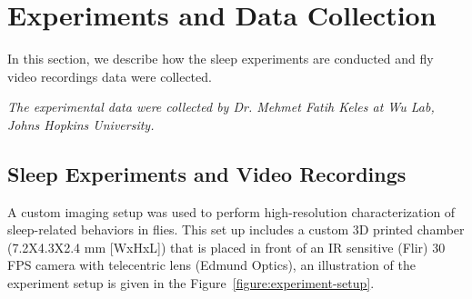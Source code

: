 \chapter{Experiments and Data Collection}\label{chapter:expt-data-collection}
In this section, we describe how the sleep experiments are conducted and fly video recordings data were collected.

\textit{The experimental data were collected by Dr. Mehmet Fatih Keles at Wu Lab, Johns Hopkins University.}

\section{Sleep Experiments and Video Recordings}
A custom imaging setup was used to perform high-resolution characterization of sleep-related behaviors in flies. This set up includes a custom 3D printed chamber (7.2X4.3X2.4 mm [WxHxL]) that is placed in front of an IR sensitive (Flir) 30 FPS camera with telecentric lens (Edmund Optics), an illustration of the experiment setup is given in the Figure~\ref{figure:experiment-setup}.

